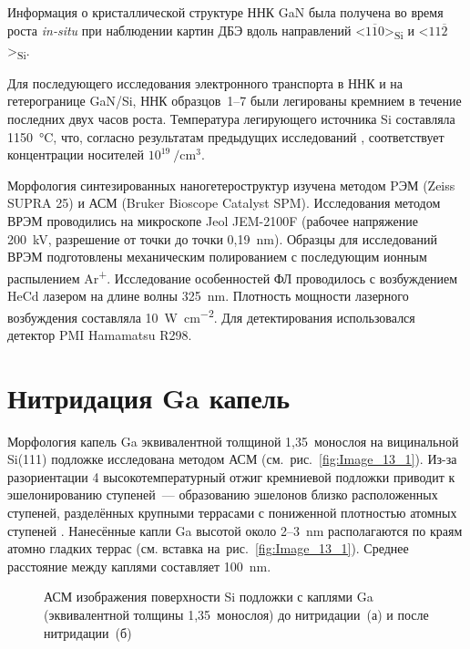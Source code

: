 Информация о кристаллической структуре ННК GaN была получена во время роста
\textit{in-situ} при наблюдении картин ДБЭ вдоль направлений
<\(1\overline{1}0\)>\textsubscript{Si} и
<\(11\overline{2}\)>\textsubscript{Si}.

Для последующего исследования электронного транспорта в ННК и на гетерогранице
GaN/Si, ННК образцов~1--7 были легированы кремнием в течение последних двух
часов роста. Температура легирующего источника Si составляла
1150~\si{\degreeCelsius}, что, согласно результатам предыдущих исследований
\cite{Bolshakov2018}, соответствует концентрации носителей
\(10^{19}~\si{\per\centi\meter\cubed}\).

Морфология синтезированных наногетероструктур изучена методом PЭМ (Zeiss SUPRA
25) и АСМ (Bruker Bioscope Catalyst SPM). Исследования методом ВРЭМ проводились
на микроскопе Jeol JEM-2100F (рабочее напряжение 200~\si{\kilo\volt},
разрешение от точки до точки 0,19~\si{\nano\meter}). Образцы для исследований
ВРЭМ подготовлены механическим полированием с последующим ионным распылением
Ar\textsuperscript{+}. Исследование особенностей ФЛ проводилось с возбуждением
HeCd лазером на длине волны 325~\si{\nano\meter}. Плотность мощности лазерного
возбуждения составляла 10~\si{\watt\per\centi\meter\squared}. Для
детектирования использовался детектор PMI Hamamatsu R298.

\section{Нитридация Ga капель}\label{sec:ch3/sec2}

Морфология капель Ga эквивалентной толщиной 1,35~монослоя на вицинальной
Si(111) подложке исследована методом АСМ (см.~рис.~\cref{fig:Image_13_1}).
Из-за разориентации 4{\textdegree} высокотемпературный отжиг кремниевой
подложки приводит к эшелонированию ступеней~--- образованию эшелонов близко
расположенных ступеней, разделённых крупными террасами с пониженной плотностью
атомных ступеней \cite{Latyshev1998, Hibino1994}. Нанесённые капли Ga высотой
около 2--3~\si{\nano\meter} располагаются по краям атомно гладких террас (см.
вставка на~рис.~\cref{fig:Image_13_1}). Среднее расстояние между каплями
составляет 100~\si{\nano\meter}.

\begin{figure}[ht] 
				\caption{АСМ изображения поверхности Si подложки с каплями Ga
			(эквивалентной толщины 1,35~монослоя) до нитридации~(а) и после
	нитридации~(б)}\label{fig:Image_13} \end{figure}


